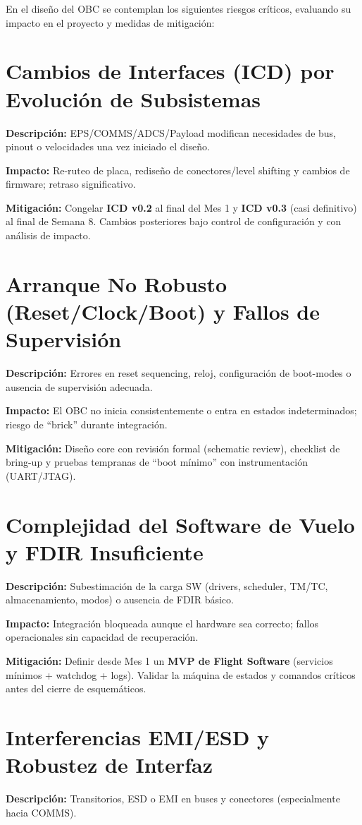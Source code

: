 En el diseño del OBC se contemplan los siguientes riesgos críticos, evaluando su impacto en el proyecto y medidas de mitigación:

\section{Cambios de Interfaces (ICD) por Evolución de Subsistemas}
\textbf{Descripción:} EPS/COMMS/ADCS/Payload modifican necesidades de bus, pinout o velocidades una vez iniciado el diseño.

\textbf{Impacto:} Re-ruteo de placa, rediseño de conectores/level shifting y cambios de firmware; retraso significativo.

\textbf{Mitigación:} Congelar \textbf{ICD v0.2} al final del Mes 1 y \textbf{ICD v0.3} (casi definitivo) al final de Semana 8. Cambios posteriores bajo control de configuración y con análisis de impacto.

\section{Arranque No Robusto (Reset/Clock/Boot) y Fallos de Supervisión}
\textbf{Descripción:} Errores en reset sequencing, reloj, configuración de boot-modes o ausencia de supervisión adecuada.

\textbf{Impacto:} El OBC no inicia consistentemente o entra en estados indeterminados; riesgo de “brick” durante integración.

\textbf{Mitigación:} Diseño core con revisión formal (schematic review), checklist de bring-up y pruebas tempranas de “boot mínimo” con instrumentación (UART/JTAG).

\section{Complejidad del Software de Vuelo y FDIR Insuficiente}
\textbf{Descripción:} Subestimación de la carga SW (drivers, scheduler, TM/TC, almacenamiento, modos) o ausencia de FDIR básico.

\textbf{Impacto:} Integración bloqueada aunque el hardware sea correcto; fallos operacionales sin capacidad de recuperación.

\textbf{Mitigación:} Definir desde Mes 1 un \textbf{MVP de Flight Software} (servicios mínimos + watchdog + logs). Validar la máquina de estados y comandos críticos antes del cierre de esquemáticos.

\section{Interferencias EMI/ESD y Robustez de Interfaz}
\textbf{Descripción:} Transitorios, ESD o EMI en buses y conectores (especialmente hacia COMMS).

